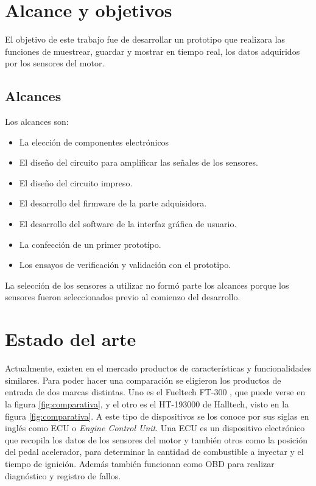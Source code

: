 \section{Alcance y objetivos}

El objetivo de este trabajo fue de desarrollar un prototipo que realizara las funciones de muestrear, guardar y mostrar en tiempo real, los datos adquiridos por los sensores del motor.

\subsection{Alcances}

Los alcances son:
\begin{itemize}
\item La elección de componentes electrónicos
\item El diseño del circuito para amplificar las señales de los sensores.
\item El diseño del circuito impreso.
\item El desarrollo del firmware de la parte adquisidora.
\item El desarrollo del software de la interfaz gráfica de usuario.
\item La confección de un primer prototipo.
\item Los ensayos de verificación y validación con el prototipo.
\end{itemize}

La selección de los sensores a utilizar no formó parte los alcances porque los sensores fueron seleccionados previo al comienzo del desarrollo.

\section{Estado del arte}

Actualmente, existen en el mercado productos de características y funcionalidades similares. Para poder hacer una comparación se eligieron los productos de entrada de dos marcas distintas. Uno es el Fueltech FT-300 \citep{ft-300}, que puede verse en la figura \ref{fig:comparativa},  y el otro es el HT-193000 \citep{ht-193000} de Halltech, visto en la figura \ref{fig:comparativa}. A este tipo de dispositivos se los conoce por sus siglas en inglés como ECU o \textit{Engine Control Unit}. Una ECU es un dispositivo electrónico que recopila los datos de los sensores del motor y también otros como la posición del pedal acelerador, para determinar la cantidad de combustible a inyectar y el tiempo de ignición. Además también funcionan como OBD para realizar diagnóstico y registro de fallos.

